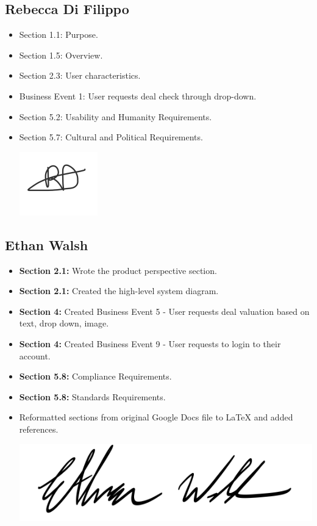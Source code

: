 \documentclass[]{article}
\begin{document}
\subsection{Rebecca Di Filippo}
\begin{itemize}
    \item Section 1.1: Purpose.
    \item Section 1.5: Overview.
    \item Section 2.3: User characteristics.
    \item Business Event 1: User requests deal check through drop-down.
    \item Section 5.2: Usability and Humanity Requirements.
    \item Section 5.7: Cultural and Political Requirements.
    \begin{center}
        \includegraphics[scale=2]{Images/rebecca.png}
    \end{center}
\end{itemize}

\subsection{Ethan Walsh}
\begin{itemize}
    \item \textbf{Section 2.1:} Wrote the product perspective section.
    \item \textbf{Section 2.1:} Created the high-level system diagram.
    \item \textbf{Section 4:} Created Business Event 5 - User requests deal valuation based on text, drop down, image.
    \item \textbf{Section 4:} Created Business Event 9 - User requests to login to their account.
    \item \textbf{Section 5.8:} Compliance Requirements.
    \item \textbf{Section 5.8:} Standards Requirements.
    \item Reformatted sections from original Google Docs file to LaTeX and added references.
    \begin{center}
        \includegraphics[scale=0.7]{Images/ethan.png}
    \end{center}
\end{itemize}
\end{document}
